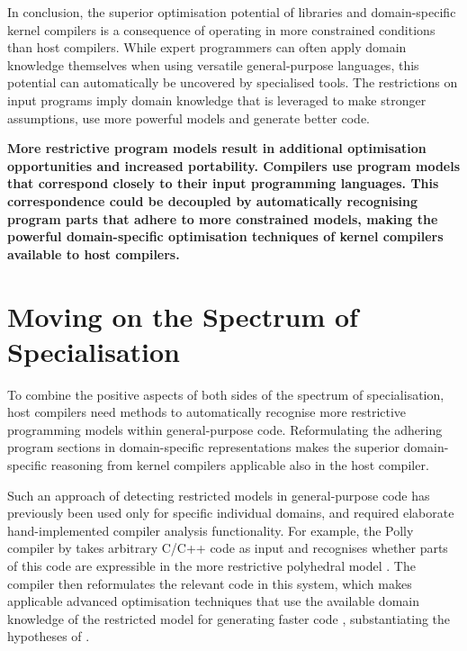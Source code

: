     In conclusion, the superior optimisation potential of libraries and
    domain-specific kernel compilers is a consequence of operating in more
    constrained conditions than host compilers.
    While expert programmers can often apply domain knowledge themselves
    when using versatile general-purpose languages, this potential can
    automatically be uncovered by specialised tools.
    The restrictions on input programs imply domain knowledge that is leveraged
    to make stronger assumptions, use more powerful models and generate better
    code.

    {\bf
    More restrictive program models result in additional optimisation
    opportunities and increased portability.
    Compilers use program models that correspond closely to their input
    programming languages.
    This correspondence could be decoupled by automatically recognising program
    parts that adhere to more constrained models, making the powerful
    domain-specific optimisation techniques of kernel compilers available to
    host compilers.
    }

\section{Moving on the Spectrum of Specialisation}

    To combine the positive aspects of both sides of the spectrum of
    specialisation, host compilers need methods to automatically recognise more
    restrictive programming models within general-purpose code.
    Reformulating the adhering program sections in domain-specific
    representations makes the superior domain-specific reasoning from kernel
    compilers applicable also in the host compiler.

    Such an approach of detecting restricted models in general-purpose code has
    previously been used only for specific individual domains, and required
    elaborate hand-implemented compiler analysis functionality.
    For example, the Polly compiler by \citet{Lengauer2012Polly} takes
    arbitrary C/C++ code as input and recognises whether parts of this code
    are expressible in the more restrictive polyhedral model
    \citep{Karp:1967:OCU:321406.321418,benabderrahmane2010polyhedral}.
    The compiler then reformulates the relevant code in this system, which
    makes applicable advanced optimisation techniques that use the available
    domain knowledge of the restricted model for generating faster code
    \citep{Moll:2016:ISS:2892208.2892217,Doerfert2015Polly}, substantiating the
    hypotheses of .

